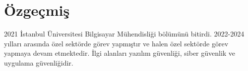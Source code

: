 \chapter*{Özgeçmiş}

2021 İstanbul Üniversitesi Bilgisayar Mühendisliği bölümünü bitirdi. 2022{-}2024 yılları arasında özel sektörde görev yapmıştır ve halen özel sektörde görev yapmaya devam etmektedir. İlgi alanları yazılım güvenliği, siber güvenlik ve uygulama güvenliğidir.
